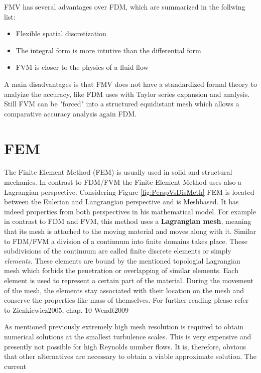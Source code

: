 FMV has several advantages over FDM, which are summarized in the follwing list:

\begin{itemize}
\item Flexible spatial discretization
\item The integral form is more intutive than the differential form
\item FVM is closer to the physics of a fluid flow
\end{itemize}

A main disadvantages is that FMV does not have a standardized formal theory to
analyize the accuracy, like FDM uses with Taylor series expansion and analysis.
Still FVM can be "forced" into a structured equidistant mesh which allows a comparative accuracy analysis again FDM.

\section{FEM}
\label{sec:main_fem}
The Finite Element Method (FEM) is usually used in solid and structural mechanics. In contrast to FDM/FVM the Finite Element Method uses also a Lagrangian perspective. Considering Figure \ref{fig:PerspVsDisMeth} FEM is located between the Eulerian
and Langrangian perspective and is Meshbased. It has indeed properties from both
perspectives in his mathematical model. For example in contrast to FDM and FVM, this method uses a \textbf{Lagrangian mesh}, meaning that its mesh is attached to the moving material and moves along with it. Similar to FDM/FVM a division of a continuum into finite domains takes place. These subdivisions of the continuum are called finite discrete elements or simply \emph{elements}. These elements are bound by the mentioned topologial Lagrangian mesh which forbids the penetration or overlapping of similar elements. Each element is used to represent a certain part of the material. During the movement of the mesh, the elements stay associated with their location on the mesh and conserve the properties like mass of themselves.
For further reading please refer to Zienkiewicz2005, chap. 10 Wendt2009


As mentioned previously extremely high mesh resolution is required to obtain
numerical solutions at the smallest turbulence scales. This is very expensive and
presently not possible for high Reynolds number flows. It is, therefore, obvious that
other alternatives are necessary to obtain a viable approximate solution. The current

